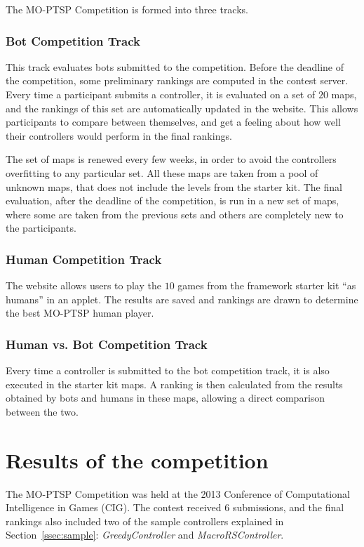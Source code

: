 \documentclass[conference]{IEEEtran}
\begin{document}
The MO-PTSP Competition is formed into three tracks.

\subsubsection{Bot Competition Track} This track evaluates bots submitted to the competition. Before the deadline of the competition, some preliminary rankings are computed in the contest server. Every time a participant submits a controller, it is evaluated on a set of $20$ maps, and the rankings of this set are automatically updated in the website. This allows participants to compare between themselves, and get a feeling about how well their controllers would perform in the final rankings.

The set of maps is renewed every few weeks, in order to avoid the controllers overfitting to any particular set. All these maps are taken from a pool of unknown maps, that does not include the levels from the starter kit. The final evaluation, after the deadline of the competition, is run in a new set of maps, where some are taken from the previous sets and others are completely new to the participants.

\subsubsection{Human Competition Track} The website allows users to play the $10$ games from the framework starter kit ``as humans'' in an applet. The results are saved and rankings are drawn to determine the best MO-PTSP human player.

\subsubsection{Human vs. Bot Competition Track} Every time a controller is submitted to the bot competition track, it is also executed in the starter kit maps. A ranking is then calculated from the results obtained by bots and humans in these maps, allowing a direct comparison between the two.

\section{Results of the competition} \label{sec:res}

The MO-PTSP Competition was held at the 2013 Conference of Computational Intelligence in Games (CIG). The contest received $6$ submissions, and the final rankings also included two of the sample controllers explained in Section~\ref{ssec:sample}: \textit{GreedyController} and \textit{MacroRSController}.
\end{document}
